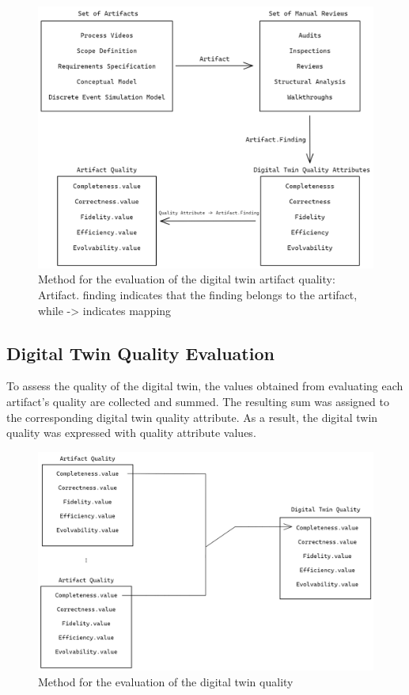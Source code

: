 \documentclass{llncs}
\begin{document}
    \begin{figure}[htbp]
        \includegraphics[scale = 0.30]{RequirementSpecifications.png}
        \caption{Method for the evaluation of the digital twin artifact quality: Artifact. finding indicates that the finding belongs to the artifact, while -> indicates mapping}
        \label{fig:Method}
    \end{figure}
    
    \subsection{Digital Twin Quality Evaluation}
    To assess the quality of the digital twin, the values obtained from evaluating each artifact's quality are collected and summed. 
    The resulting sum was assigned to the corresponding digital twin quality attribute. 
    As a result, the digital twin quality was expressed with quality attribute values.    
  
    \begin{figure}[htbp]
        \includegraphics[scale = 0.25]{DigitalTwinQuality.png}
            \caption{Method for the evaluation of the digital twin quality}
        \label{fig:MethodforDigitalTwinQuality}
    \end{figure}
   
\end{document}
